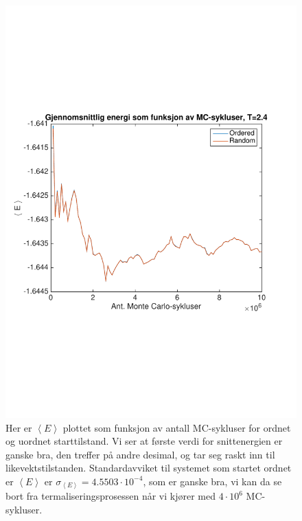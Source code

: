 \documentclass[norsk, 10pt]{article}
\def\mean#1{\left\langle #1 \right\rangle}
\begin{document}
\begin{figure}[H]
\centering
\includegraphics[scale = 0.6, trim = 1cm 8cm 1cm 8cm]{b_avgEnergy_MC_L2_T24.pdf}
\caption{Her er $\mean E$ plottet som funksjon av antall MC-sykluser for ordnet og uordnet starttilstand. Vi ser at første verdi for snittenergien er ganske bra, den treffer på andre desimal, og tar seg raskt inn til likevektstilstanden. Standardavviket til systemet som startet ordnet er $\mean E$ er $\sigma_{\mean E} = 4.5503\cdot10^{-4}$, som er ganske bra, vi kan da se bort fra termaliseringsprosessen når vi kjører med $4\cdot10^6$ MC-sykluser.}
\label{fig:meanET24}
\end{figure}
\end{document}

